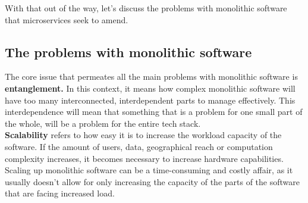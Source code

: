 With that out of the way, let's discuss the problems with monolithic software that microservices seek to amend.

\subsection{The problems with monolithic software}
The core issue that permeates all the main problems with monolithic software is \textbf{entanglement.}
In this context, it means how complex monolithic software will have too many interconnected, interdependent parts to manage effectively.
This interdependence will mean that something that is a problem for one small part of the whole, will be a problem for the entire tech stack. \\
\textbf{Scalability} refers to how easy it is to increase the workload capacity of the software. 
If the amount of users, data, geographical reach or computation complexity increases, it becomes necessary to increase hardware capabilities. 
Scaling up monolithic software can be a time-consuming and costly affair, as it usually doesn't allow for only increasing the capacity of the parts of the software that are facing increased load. 
